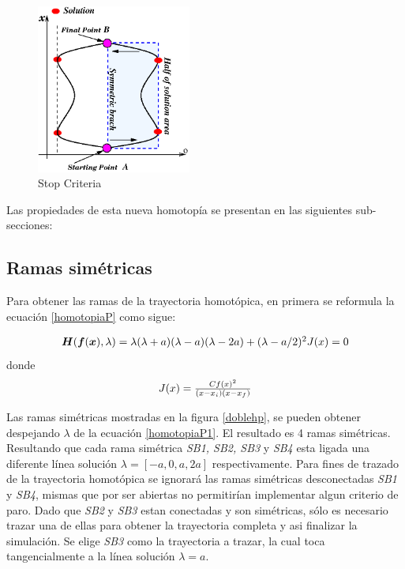 \documentclass[conference,letterpaper,onecolumn]{IEEEtran}
\newcommand{\pig}[1]{\mbox{\boldmath ${#1}$}	}
\begin{document}
\begin{figure}[hbtp]
\centering
\includegraphics[width=2in]{figs/chap3/figs/dbh2.eps}
\caption{Stop Criteria}
\label{halftrack}
\end{figure}

Las propiedades de esta nueva homotop{\'i}a se presentan en las siguientes sub-secciones:

\subsection{Ramas sim\'etricas}

Para obtener las ramas de la trayectoria homot\'opica, en primera se reformula la ecuaci\'on \ref{homotopiaP} como sigue:

\begin{equation}
{%
\begin{array}{l}
\pig{H}(\pig{f}(\pig{x}),\lambda )=\lambda(\lambda+a)(\lambda-a)(\lambda-2a)+(\lambda-a/2)^2 J(x)=0
\end{array}}
\label{homotopiaP1}
\end{equation}
donde 
\begin{displaymath}
\begin{array}{l}
 J(x)= {Cf(x)^2 \over (x-x_i)(x-x_f)}
\end{array}
\end{displaymath}

Las ramas sim\'etricas mostradas en la figura \ref{doblehp}, se pueden obtener despejando $\lambda$ de la ecuaci\'on \ref{homotopiaP1}. 
El resultado
es 4 ramas sim\'etricas. Resultando que cada rama sim\'etrica {\it SB1, SB2, SB3} y {\it SB4} esta ligada una diferente l{\'i}nea soluci\'on $\lambda=[-a,0,a,2a]$ respectivamente.
Para fines de trazado de la trayectoria homot\'opica se ignorar\'a las ramas sim\'etricas desconectadas {\it SB1} y {\it SB4}, mismas que por
ser abiertas no permitir{\'i}an implementar algun criterio de paro. Dado que {\it SB2} y {\it SB3} estan conectadas y son sim\'etricas, s\'olo es necesario trazar una de ellas
para obtener la trayectoria completa y asi finalizar la simulaci\'on. Se elige {\it SB3} como la trayectoria a trazar, la cual toca tangencialmente a la l{\'i}nea soluci\'on $\lambda=a$.
\end{document}
